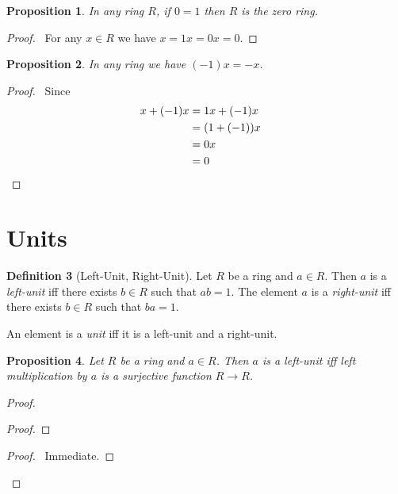 \documentclass{book}
\let\qed\relax
\newtheorem{prop}{Proposition}[chapter]
\theoremstyle{definition}
\newtheorem{df}[prop]{Definition}
\begin{document}
\begin{prop}
In any ring $R$, if $0 = 1$ then $R$ is the zero ring.
\end{prop}

\begin{proof}
\pf\ For any $x \in R$ we have $x = 1x = 0x = 0$. \qed
\end{proof}

\begin{prop}
In any ring we have $(-1)x = -x$.
\end{prop}

\begin{proof}
\pf\ Since
\begin{align*}
x + (-1)x & = 1x + (-1) x \\
& = (1 + (-1))x \\
& = 0x \\
& = 0 & \qed
\end{align*}
\end{proof}

\section{Units}

\begin{df}[Left-Unit, Right-Unit]
Let $R$ be a ring and $a \in R$. Then $a$ is a \emph{left-unit} iff there exists $b \in R$ such that $ab = 1$. The element $a$ is a \emph{right-unit} iff there exists $b \in R$ such that $ba = 1$.

An element is a \emph{unit} iff it is a left-unit and a right-unit.
\end{df}

\begin{prop}
Let $R$ be a ring and $a \in R$. Then $a$ is a left-unit iff left multiplication by $a$ is a surjective function $R \rightarrow R$.
\end{prop}

\begin{proof}
\pf
{}
\begin{proof}
\end{proof}
\begin{proof}
	\pf\ Immediate.
\end{proof}
\qed
\end{proof}
\end{document}
